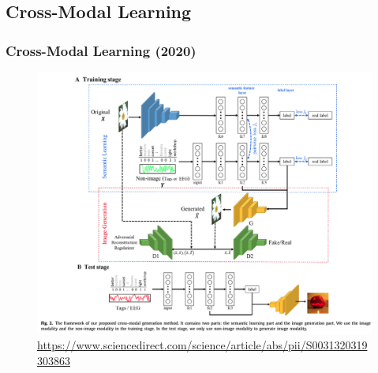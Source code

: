 \documentclass{beamer}
\begin{document}
\subsection{Cross-Modal Learning}

\begin{frame}
\frametitle{Cross-Modal Learning (2020)}
\begin{figure}
	\includegraphics[width=0.65\linewidth]{image/crossmodal}
	\caption{\url{https://www.sciencedirect.com/science/article/abs/pii/S0031320319303863}}
\end{figure}
\end{frame}
\end{document}
